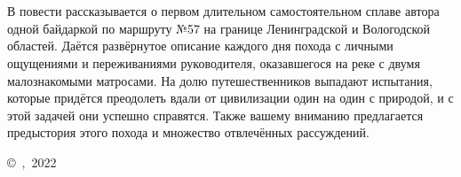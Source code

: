 \chapter*{}
В повести рассказывается о первом длительном самостоятельном сплаве автора одной байдаркой по маршруту №57 на границе Ленинградской и Вологодской областей. Даётся развёрнутое описание каждого дня похода с личными ощущениями и переживаниями руководителя, оказавшегося на реке с двумя малознакомыми матросами. На долю путешественников выпадают испытания, которые придётся преодолеть вдали от цивилизации один на один с природой, и с этой задачей они успешно справятся. Также вашему вниманию предлагается предыстория этого похода и множество отвлечённых рассуждений.
\vspace{\fill}
\begin{flushright}
	\copyright~\MyVarAuthorName,~2022
\end{flushright}